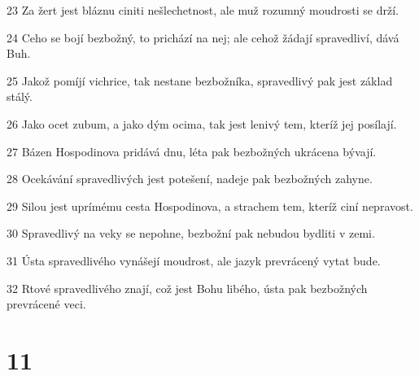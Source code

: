 \par 23 Za žert jest bláznu ciniti nešlechetnost, ale muž rozumný moudrosti se drží.
\par 24 Ceho se bojí bezbožný, to prichází na nej; ale cehož žádají spravedliví, dává Buh.
\par 25 Jakož pomíjí vichrice, tak nestane bezbožníka, spravedlivý pak jest základ stálý.
\par 26 Jako ocet zubum, a jako dým ocima, tak jest lenivý tem, kteríž jej posílají.
\par 27 Bázen Hospodinova pridává dnu, léta pak bezbožných ukrácena bývají.
\par 28 Ocekávání spravedlivých jest potešení, nadeje pak bezbožných zahyne.
\par 29 Silou jest uprímému cesta Hospodinova, a strachem tem, kteríž ciní nepravost.
\par 30 Spravedlivý na veky se nepohne, bezbožní pak nebudou bydliti v zemi.
\par 31 Ústa spravedlivého vynášejí moudrost, ale jazyk prevrácený vytat bude.
\par 32 Rtové spravedlivého znají, což jest Bohu libého, ústa pak bezbožných prevrácené veci.

\chapter{11}

